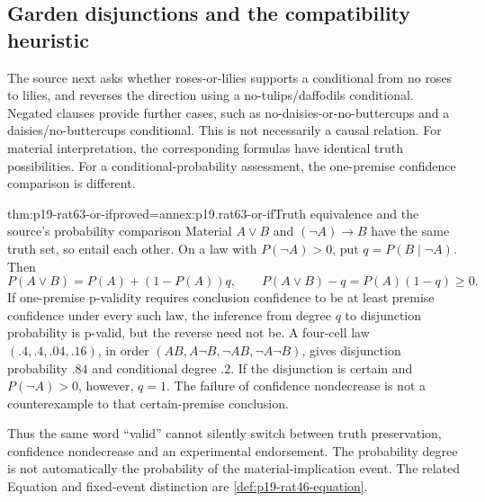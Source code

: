 \subsection{Garden disjunctions and the compatibility heuristic}

The source next asks whether roses-or-lilies supports a conditional
from no roses to lilies, and reverses the direction using a
no-tulips/daffodils conditional. Negated clauses provide further cases,
such as no-daisies-or-no-buttercups and a daisies/no-buttercups
conditional. This is not necessarily a causal relation.
For material interpretation, the corresponding formulas have identical
truth possibilities. For a conditional-probability assessment, the
one-premise confidence comparison is different.

\begin{hblemma}{thm:p19-rat63-or-if}{proved=annex:p19.rat63-or-if}{Truth equivalence and the source's probability comparison}
Material \(A\lor B\) and \((\neg A)\to B\) have the same
truth set, so entail each other. On a law with \(P(\neg A)>0\),
put \(q=P(B\mid\neg A)\). Then
\[
 P(A\lor B)=P(A)+(1-P(A))q,
 \qquad P(A\lor B)-q=P(A)(1-q)\geq0.
\]
If one-premise p-validity requires conclusion confidence to be at
least premise confidence under every such law, the inference from
degree \(q\) to disjunction probability is p-valid, but the reverse
need not be. A four-cell law \((.4,.4,.04,.16)\), in order
\((AB,A\neg B,\neg AB,\neg A\neg B)\), gives disjunction
probability \(.84\) and conditional degree \(.2\).
If the disjunction is certain and \(P(\neg A)>0\), however,
\(q=1\). The failure of confidence nondecrease is not a
counterexample to that certain-premise conclusion.
\end{hblemma}

Thus the same word ``valid'' cannot silently switch between truth
preservation, confidence nondecrease and an experimental endorsement.
The probability degree is not automatically the probability of the
material-implication event. The related Equation and fixed-event
distinction are \cref{def:p19-rat46-equation}.

